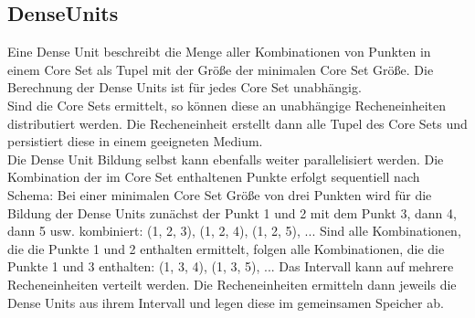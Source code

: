 \subsection{DenseUnits}

Eine Dense Unit beschreibt die Menge aller Kombinationen von Punkten in einem Core Set als Tupel mit der Größe der
minimalen Core Set Größe. Die Berechnung der Dense Units ist für jedes Core Set unabhängig.\\
Sind die Core Sets ermittelt, so können diese an unabhängige Recheneinheiten distributiert werden. Die Recheneinheit
erstellt dann alle Tupel des Core Sets und persistiert diese in einem geeigneten Medium.\\
Die Dense Unit Bildung selbst kann ebenfalls weiter parallelisiert werden. Die Kombination der im Core Set enthaltenen
Punkte erfolgt sequentiell nach Schema: Bei einer minimalen Core Set Größe von drei Punkten wird für die Bildung der
Dense Units zunächst der Punkt 1 und 2 mit dem Punkt 3, dann 4, dann 5 usw. kombiniert: (1, 2, 3), (1, 2, 4), (1, 2, 5), ...
Sind alle Kombinationen, die die Punkte 1 und 2 enthalten ermittelt, folgen alle Kombinationen, die die Punkte 1 und 3 enthalten:
(1, 3, 4), (1, 3, 5), ... Das Intervall kann auf mehrere Recheneinheiten verteilt werden. Die Recheneinheiten ermitteln dann
jeweils die Dense Units aus ihrem Intervall und legen diese im gemeinsamen Speicher ab.